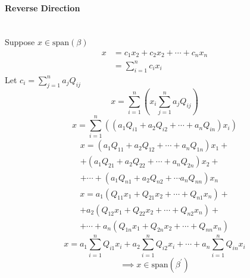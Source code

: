 \paragraph{Reverse Direction}\hfill\\
Suppose $x \in \text{span}(\beta)$
\begin{align}
x &= c_1x_2 + c_2x_2 + \cdots + c_nx_n\\
&= \sum\limits_{i=1}^nc_ix_i
\end{align}
Let $c_i =\sum\limits_{j=1}^na_jQ_{ij}$
\begin{equation}
x = \sum\limits_{i=1}^n\left(x_i\sum\limits_{j=1}^na_jQ_{ij}\right)
\end{equation}
\begin{equation}
x = \sum\limits_{i=1}^n\left(\left(a_1Q_{i1} + a_2Q_{i2} +\cdots +a_nQ_{in}\right)x_i\right)
\end{equation}
\begin{multline}
x = (a_1Q_{11} + a_2Q_{12} + \cdots + a_nQ_{1n})x_1 +\\ 
+ (a_1Q_{21} + a_2Q_{22} + \cdots +a_nQ_{2n})x_2 + \\
+ \cdots + (a_1Q_{n1} + a_2Q_{n2} + \cdots a_nQ_{nn})x_n
\end{multline}
\begin{multline}
x = a_1(Q_{11}x_1 +Q_{21}x_2 + \cdots +Q_{n1}x_n) + \\
+ a_2(Q_{12}x_1 + Q_{22}x_2 + \cdots + Q_{n2}x_n) +\\
+\cdots + a_n(Q_{1n}x_1 + Q_{2n}x_2 + \cdots + Q_{nn}x_n)
\end{multline}
\begin{equation}
x = a_1\sum\limits_{i=1}^nQ_{i1}x_i +a_2\sum\limits_{i=1}^nQ_{i2}x_i
+\cdots +a_n\sum\limits_{i=1}^nQ_{in}x_i
\end{equation}
\begin{equation}
\implies x \in \text{span}(\beta^\prime)
\end{equation}
